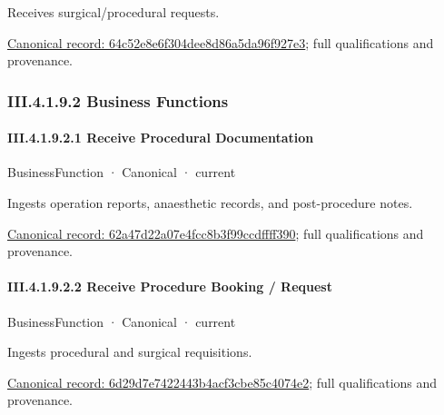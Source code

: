 Receives surgical/procedural requests.


{\footnotesize \href{../../../../../../../continuum/business/business-service/64c52e8e6f304dee8d86a5da96f927e3.md}{Canonical record: 64c52e8e6f304dee8d86a5da96f927e3}; full qualifications and provenance.}\par
\subsubsection*{III.4.1.9.2 Business Functions}
\label{navigation:III.4.1.9.2}

\paragraph*{III.4.1.9.2.1 Receive Procedural Documentation}
\label{navigation:III.4.1.9.2.1}

\label{element:62a47d22a07e4fcc8b3f99ccdffff390}
{\small BusinessFunction · Canonical · current}\par

Ingests operation reports, anaesthetic records, and post-procedure notes.


{\footnotesize \href{../../../../../../../continuum/business/business-function/62a47d22a07e4fcc8b3f99ccdffff390.md}{Canonical record: 62a47d22a07e4fcc8b3f99ccdffff390}; full qualifications and provenance.}\par
\paragraph*{III.4.1.9.2.2 Receive Procedure Booking / Request}
\label{navigation:III.4.1.9.2.2}

\label{element:6d29d7e7422443b4acf3cbe85c4074e2}
{\small BusinessFunction · Canonical · current}\par

Ingests procedural and surgical requisitions.


{\footnotesize \href{../../../../../../../continuum/business/business-function/6d29d7e7422443b4acf3cbe85c4074e2.md}{Canonical record: 6d29d7e7422443b4acf3cbe85c4074e2}; full qualifications and provenance.}\par
